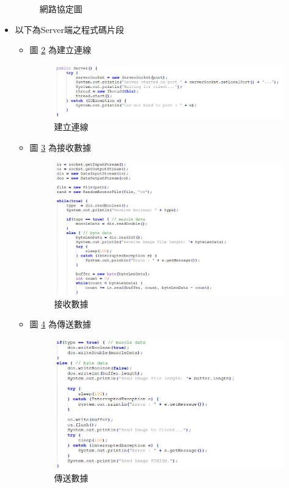\documentclass[12pt]{article}  %
\theoremstyle{plain}
\begin{document}
\begin{itemize}
\begin{figure}[htbp]
{}
\caption{網路協定圖} \label{網路協定圖}
\end{figure}
\newpage

\item 以下為Server端之程式碼片段
\begin{itemize}
\item 圖 \ref{S建立連線} 為建立連線
\begin{figure}[htbp]
\centering
\includegraphics[width=10cm]{pic/ch2/code-Server.JPG}
\caption{建立連線} \label{S建立連線}
\end{figure}
\item 圖 \ref{S接收數據} 為接收數據
\begin{figure}[htbp]
\centering
\includegraphics[width=10cm]{pic/ch2/code-Server2.JPG}
\caption{接收數據} \label{S接收數據}
\end{figure}
\item 圖 \ref{S傳送數據} 為傳送數據
\begin{figure}[htbp]
\centering
\includegraphics[width=10cm]{pic/ch2/code-Server3.JPG}
\caption{傳送數據} \label{S傳送數據}
\end{figure}
\end{itemize}
\newpage


\end{itemize}
\end{document}
